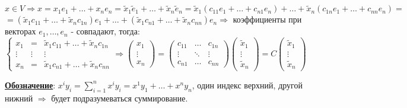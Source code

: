 \documentclass[12pt]{article}
\theoremstyle{definition}
\begin{document}
$x \in V \Rightarrow x = x_1 e_1 + \dotsc + x_n e_n = \widetilde{x}_1 \widetilde{e}_1 + \dotsc + \widetilde{x}_n \widetilde{e}_n = \widetilde{x}_1(c_{11} e_1 + \dotsc + c_{n1}e_n) + \dotsc + \widetilde{x}_n(c_{1n} e_1 + \dotsc + c_{nn}e_n) = $\\
$ = (\widetilde{x}_1 c_{11} + \dotsc + \widetilde{x}_n c_{1n})e_1 + \dotsc + (\widetilde{x}_1 c_{n1} + \dotsc + \widetilde{x}_n c_{nn})e_n \Rightarrow$ коэффициенты при векторах $e_1, \dotsc, e_n$ - совпадают, тогда:
$$
	\left\{
	\begin{array}{ccc} 
		x_1 &=& \widetilde{x}_1 c_{11} + \dotsc + \widetilde{x}_n c_{1n}\\
		\vdots&\vdots&\vdots \\
		x_n &=&\widetilde{x}_1 c_{n1} + \dotsc + \widetilde{x}_n c_{nn}
	\end{array}	\right. \Rightarrow
	\begin{pmatrix} 
		x_1 \\ \vdots \\ x_n
	\end{pmatrix} 
	= 
	\begin{pmatrix} 
		c_{11} & \dotsc & c_{1n}\\ 
		\vdots & \ddots & \vdots\\ 
		c_{n1} & \dotsc & c_{nn}
	\end{pmatrix}
	\begin{pmatrix} 
		\widetilde{x}_1 \\ \vdots \\ \widetilde{x}_n 
	\end{pmatrix} 
	= 
	C
	\begin{pmatrix} 
		\widetilde{x}_1 \\ \vdots \\ \widetilde{x}_n 
	\end{pmatrix} 
$$

\textbf{\uline{Обозначение}}: $x^i y_i = \displaystyle \sum\limits_{i = 1}^{n} x^i y_i = x^1y_1 + \dotsc + x^n y_n$, один индекс верхний, другой нижний $\Rightarrow$ будет подразумеваться суммирование.
\end{document}

